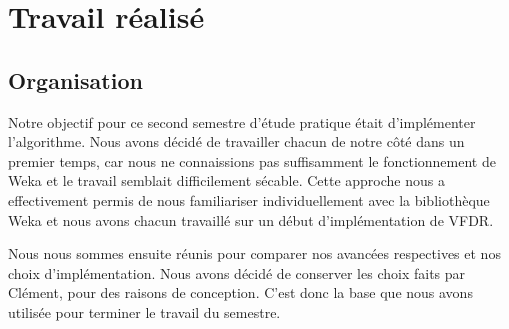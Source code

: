 \section{Travail réalisé}

    \subsection{Organisation} 

        Notre objectif pour ce second semestre d’étude pratique était d’implémenter l’algorithme. Nous avons décidé de travailler chacun de notre côté dans un premier temps, car nous ne connaissions pas suffisamment le fonctionnement de Weka et le travail semblait difficilement sécable. Cette approche nous a effectivement permis de nous familiariser individuellement avec la bibliothèque Weka et nous avons chacun travaillé sur un début d’implémentation de VFDR.

        Nous nous sommes ensuite réunis pour comparer nos avancées respectives et nos choix d’implémentation. Nous avons décidé de conserver les choix faits par Clément, pour des raisons de conception. C’est donc la base que nous avons utilisée pour terminer le travail du semestre.

